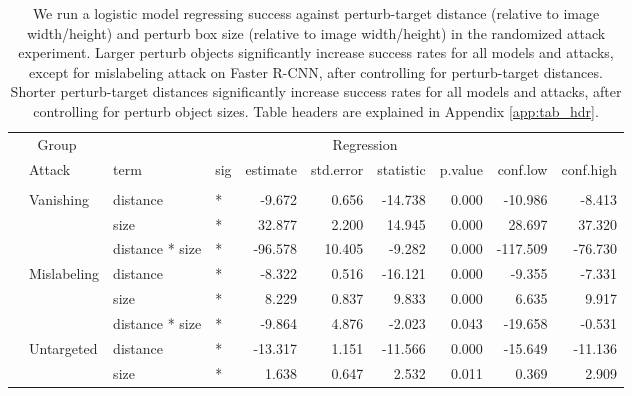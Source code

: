\begin{longtable}[t]{llllrrrrrr}
\caption{\label{tab:perturb_bbox_and_object_dist_table}We run a logistic model regressing success against perturb-target distance (relative to image width/height) and perturb box size (relative to image width/height) in the randomized attack experiment. Larger perturb objects significantly increase success rates for all models and attacks, except for mislabeling attack on Faster R-CNN, after controlling for perturb-target distances. Shorter perturb-target distances significantly increase success rates for all models and attacks, after controlling for perturb object sizes. Table headers are explained in Appendix \ref{app:tab_hdr}.}\\
\toprule
\multicolumn{2}{c}{Group} & \multicolumn{8}{c}{Regression} \\
\cmidrule(l{3pt}r{3pt}){1-2} \cmidrule(l{3pt}r{3pt}){3-10}
 & Attack & term & sig & estimate & std.error & statistic & p.value & conf.low & conf.high\\
\midrule
\addlinespace[0.3em]
\multicolumn{10}{l}{\textbf{YOLOv3}}\\
\hspace{1em} & Vanishing & distance & * & -9.672 & 0.656 & -14.738 & 0.000 & -10.986 & -8.413\\
\cmidrule{3-10}\nopagebreak
\hspace{1em} &  & size & * & 32.877 & 2.200 & 14.945 & 0.000 & 28.697 & 37.320\\
\cmidrule{3-10}\nopagebreak
\hspace{1em} &  & distance * size & * & -96.578 & 10.405 & -9.282 & 0.000 & -117.509 & -76.730\\
\cmidrule{2-10}\nopagebreak
\hspace{1em} & Mislabeling & distance & * & -8.322 & 0.516 & -16.121 & 0.000 & -9.355 & -7.331\\
\cmidrule{3-10}\nopagebreak
\hspace{1em} &  & size & * & 8.229 & 0.837 & 9.833 & 0.000 & 6.635 & 9.917\\
\cmidrule{3-10}\nopagebreak
\hspace{1em} &  & distance * size & * & -9.864 & 4.876 & -2.023 & 0.043 & -19.658 & -0.531\\
\cmidrule{2-10}\nopagebreak
\hspace{1em} & Untargeted & distance & * & -13.317 & 1.151 & -11.566 & 0.000 & -15.649 & -11.136\\
\cmidrule{3-10}\nopagebreak
\hspace{1em} &  & size & * & 1.638 & 0.647 & 2.532 & 0.011 & 0.369 & 2.909\\

\end{longtable}
